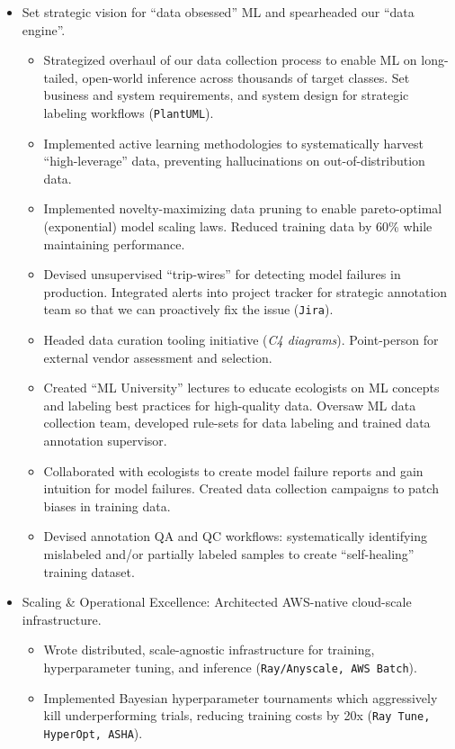 \documentclass[a4paper,12pt]{article}
\begin{document}
\begin{itemize}
        \item Set strategic vision for ``data obsessed'' ML and spearheaded our ``data engine''.
        \begin{itemize}
            \item Strategized overhaul of our data collection process to enable ML on long-tailed, open-world inference across thousands of target classes. Set business and system requirements, and system design for strategic labeling workflows (\texttt{PlantUML}).
            \item Implemented active learning methodologies to systematically harvest ``high-leverage'' data, preventing hallucinations on out-of-distribution data.
            \item Implemented novelty-maximizing data pruning to enable pareto-optimal (exponential) model scaling laws. Reduced training data by 60\% while maintaining performance.
            \item Devised unsupervised ``trip-wires'' for detecting model failures in production. Integrated alerts into project tracker for strategic annotation team so that we can proactively fix the issue (\texttt{Jira}).
            \item Headed data curation tooling initiative (\textit{C4 diagrams}). Point-person for external vendor assessment and selection.
            \item Created ``ML University'' lectures to educate ecologists on ML concepts and labeling best practices for high-quality data. Oversaw ML data collection team, developed rule-sets for data labeling and trained data annotation supervisor.
            \item Collaborated with ecologists to create model failure reports and gain intuition for model failures. Created data collection campaigns to patch biases in training data.
            \item Devised annotation QA and QC workflows: systematically identifying mislabeled and/or partially labeled samples to create ``self-healing'' training dataset.
        \end{itemize}
        \item Scaling \& Operational Excellence: Architected AWS-native cloud-scale infrastructure.
        \begin{itemize}
            \item Wrote distributed, scale-agnostic infrastructure for training, hyperparameter tuning, and inference (\texttt{Ray/Anyscale, AWS Batch}).
            \item Implemented Bayesian hyperparameter tournaments which aggressively kill underperforming trials, reducing training costs by 20x (\texttt{Ray Tune, HyperOpt, ASHA}).

\end{itemize}
\end{itemize}
\end{document}
